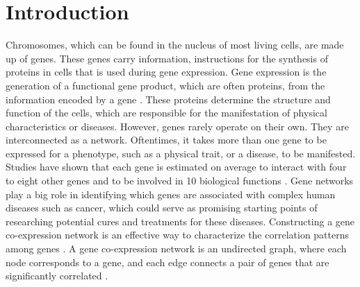 \documentclass[sigconf,authordraft]{acmart}
\begin{document}


\maketitle

\section{Introduction}
Chromosomes, which can be found in the nucleus of most living cells, are made up of genes. These genes carry information, instructions for the synthesis of proteins in cells that is used during gene expression. Gene expression is the generation of a functional gene product, which are often proteins, from the information encoded by a gene \cite{na001}. These proteins determine the structure and function of the cells, which are responsible for the manifestation of physical characteristics or diseases. However, genes rarely operate on their own. They are interconnected as a network. Oftentimes, it takes more than one gene to be expressed for a phenotype, such as a physical trait, or a disease, to be manifested. Studies have shown that each gene is estimated on average to interact with four to eight other genes and to be involved in 10 biological functions \cite{Li2018}. Gene networks play a big role in identifying which genes are associated with complex human diseases such as cancer, which could serve as promising starting points of researching potential cures and treatments for these diseases. Constructing a gene co-expression network is an effective way to characterize the correlation patterns among genes \cite{Li2018}. A gene co-expression network is an undirected graph, where each node corresponds to a gene, and each edge connects a pair of genes that are significantly correlated \cite{Li2018}.
\end{document}
